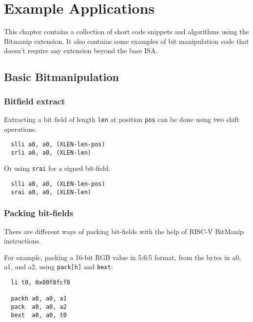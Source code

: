 \chapter{Example Applications}

This chapter contains a collection of short code snippets and algorithms using
the Bitmanip extension. It also contains some examples of bit manipulation
code that doesn't require any extension beyond the base ISA.


\section{Basic Bitmanipulation}


\subsection{Bitfield extract}

Extracting a bit field of length {\tt len} at position {\tt pos} can be done using
two shift operations.

\begin{verbatim}
  slli a0, a0, (XLEN-len-pos)
  srli a0, a0, (XLEN-len)
\end{verbatim}

Or using {\tt srai} for a signed bit-field.

\begin{verbatim}
  slli a0, a0, (XLEN-len-pos)
  srai a0, a0, (XLEN-len)
\end{verbatim}


\subsection{Packing bit-fields}

There are different ways of packing bit-fields with the help of RISC-V BitManip
instructions.

For example, packing a 16-bit RGB value in 5:6:5 format, from the bytes
in a0, a1, and a2, using {\tt pack[h]} and {\tt bext}:

\begin{minipage}{\linewidth}
\begin{verbatim}
  li t0, 0x00f8fcf8

  packh a0, a0, a1
  pack  a0, a0, a2
  bext  a0, a0, t0
\end{verbatim}
\end{minipage}

